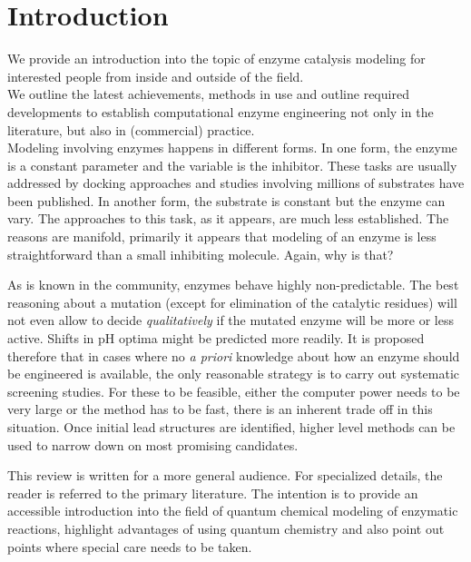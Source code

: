 \section{Introduction}\label{sec:intro}
We provide an introduction into the topic of enzyme catalysis modeling for interested people from inside and outside of the field.\\
We outline the latest achievements, methods in use and outline required developments to establish computational enzyme engineering not only in the literature, but also in (commercial) practice.\\
Modeling involving enzymes happens in different forms.
In one form, the enzyme is a constant parameter and the variable is the inhibitor.
These tasks are usually addressed by docking approaches and studies involving millions of substrates have been published\cite{zhou2010high}.
In another form, the substrate is constant but the enzyme can vary.
The approaches to this task, as it appears, are much less established.
The reasons are manifold, primarily it appears that modeling of an enzyme is less straightforward than a small inhibiting molecule.
Again, why is that?

As is known in the community, enzymes behave highly non-predictable.
The best reasoning about a mutation (except for elimination of the catalytic residues) will not even allow to decide \textit{qualitatively} if the mutated enzyme will be more or less active.
Shifts in pH optima might be predicted more readily\cite{ludwiczek2013strategies}.
It is proposed therefore that in cases where no \textit{a priori} knowledge about how an enzyme should be engineered is available, the only reasonable strategy is to carry out systematic screening studies.
For these to be feasible, either the computer power needs to be very large or the method has to be fast, there is an inherent trade off in this situation.
Once initial lead structures are identified, higher level methods can be used to narrow down on most promising candidates.

This review is written for a more general audience.
For specialized details, the reader is referred to the primary literature.
The intention is to provide an accessible introduction into the field of quantum chemical modeling of enzymatic reactions, highlight advantages of using quantum chemistry and also point out points where special care needs to be taken.


